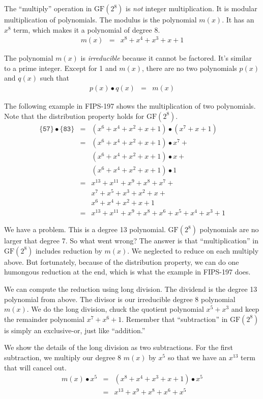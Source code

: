 \documentclass{article}
\newcommand{\GF}{\mathrm{GF}(2^8)}
\newcommand{\gfmul}{\bullet}
\begin{document}
The ``multiply'' operation in $\GF$ is \emph{not} integer multiplication.
It is modular multiplication of polynomials.
The modulus is the polynomial $m(x)$.
It has an $x^8$ term, which makes it a polynomial of degree 8.
\begin{eqnarray*}
 m(x) &=& x^8 + x^4 + x^3 + x + 1
\end{eqnarray*}

The polynomial $m(x)$ is \emph{irreducible} because it cannot be factored.
It's similar to a prime integer.
Except for 1 and $m(x)$, there are no two polynomials $p(x)$ and $q(x)$ such that
\begin{eqnarray*}
p(x) \gfmul q(x) &=& m(x)
\end{eqnarray*}

The following example in FIPS-197 shows the multiplication of two polynomials.
Note that the distribution property holds for $\GF$.
\begin{eqnarray*}
  \{\mathtt{57}\} \gfmul \{\mathtt{83}\}
  &=& (x^6 + x^4 + x^2 + x + 1) \gfmul (x^7 + x + 1) \\
  &=& (x^6 + x^4 + x^2 + x + 1) \gfmul x^7 + \\
  & & (x^6 + x^4 + x^2 + x + 1) \gfmul x + \\
  & & (x^6 + x^4 + x^2 + x + 1) \gfmul 1 \\
  &=& x^{13} + x^{11} + x^9 + x^8 + x^7 + \\
  & & x^7 + x^5 + x^3 + x^2 + x + \\
  & & x^6 + x^4 + x^2 + x + 1 \\
  &=& x^{13} + x^{11} + x^9 + x^8 + x^6 + x^5 + x^4 + x^3 + 1
\end{eqnarray*}

We have a problem. This is a degree 13 polynomial.
$\GF$ polynomials are no larger that degree 7.
So what went wrong?
The answer is that ``multiplication'' in $\GF$ includes reduction by $m(x)$.
We neglected to reduce on each multiply above.
But fortunately, because of the distribution property,
we can do one humongous reduction at the end,
which is what the example in FIPS-197 does.

We can compute the reduction using long division.
The dividend is the degree 13 polynomial from above.
The divisor is our irreducible degree 8 polynomial $m(x)$.
We do the long division, chuck the quotient polynomial $x^5 + x^3$
and keep the remainder polynomial $x^7 + x^6 + 1$.
Remember that ``subtraction'' in $\GF$ is simply an exclusive-or,
just like ``addition.''

We show the details of the long division as two subtractions.
For the first subtraction, we multiply our degree 8 $m(x)$ by $x^5$
so that we have an $x^{13}$ term that will cancel out.
\begin{eqnarray*}
  m(x) \gfmul x^5 &=& (x^8 + x^4 + x^3 + x + 1) \gfmul x^5 \\
  &=& x^{13} + x^9 + x^8 + x^6 + x^5
\end{eqnarray*}
\end{document}
